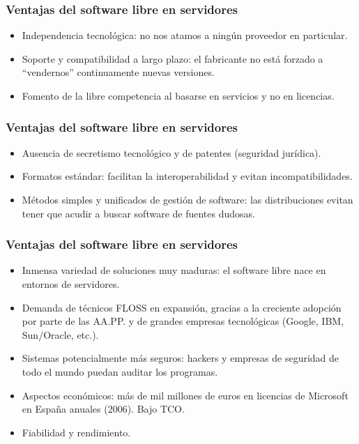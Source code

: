 \documentclass{beamer}
\begin{document}
\begin{frame}
\frametitle{Ventajas del software libre en servidores}

\begin{itemize}
\item \alert{Independencia tecnológica}: no nos atamos a ningún proveedor en particular.
\item Soporte y \alert{compatibilidad} a largo plazo: el fabricante no está forzado a ``vendernos'' continuamente nuevas versiones. 
\item Fomento de la \alert{libre competencia} al basarse en servicios y no en licencias.
\end{itemize}
\end{frame}


\begin{frame}
\frametitle{Ventajas del software libre en servidores}

\begin{itemize}
\item Ausencia de secretismo tecnológico y de patentes (seguridad jurídica). 
\item \alert{Formatos estándar}: facilitan la interoperabilidad y evitan incompatibilidades. 
\item Métodos simples y unificados de gestión de software: las distribuciones evitan tener que acudir a buscar software de fuentes dudosas.
\end{itemize}
\end{frame}


\begin{frame}
\frametitle{Ventajas del software libre en servidores}

\begin{itemize}
\item Inmensa \alert{variedad} de soluciones muy \alert{maduras}: el software libre nace en entornos de servidores.
\item Demanda de técnicos FLOSS en expansión, gracias a la creciente adopción por parte de las AA.PP. y de grandes empresas tecnológicas (Google, IBM, Sun/Oracle, etc.).
\item Sistemas \alert{potencialmente más seguros}: hackers y empresas de seguridad de todo el mundo puedan auditar los programas.
\item Aspectos económicos: más de mil millones de euros en licencias de Microsoft en España anuales (2006). Bajo TCO.
\item Fiabilidad y rendimiento.
\end{itemize}
\end{frame}
\end{document}
